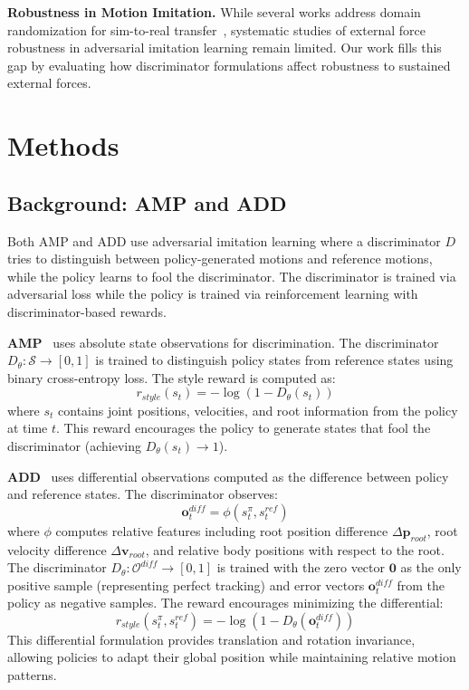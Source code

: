 \documentclass{article}
\begin{document}
\textbf{Robustness in Motion Imitation.} While several works address domain randomization for sim-to-real transfer~\citep{peng2018sim}, systematic studies of external force robustness in adversarial imitation learning remain limited. Our work fills this gap by evaluating how discriminator formulations affect robustness to sustained external forces.

\section{Methods}

\subsection{Background: AMP and ADD}

Both AMP and ADD use adversarial imitation learning where a discriminator $D$ tries to distinguish between policy-generated motions and reference motions, while the policy learns to fool the discriminator. The discriminator is trained via adversarial loss while the policy is trained via reinforcement learning with discriminator-based rewards.

\textbf{AMP}~\citep{peng2021amp} uses absolute state observations for discrimination. The discriminator $D_\theta: \mathcal{S} \rightarrow [0,1]$ is trained to distinguish policy states from reference states using binary cross-entropy loss. The style reward is computed as:
\begin{equation}
r_{style}(s_t) = -\log(1 - D_\theta(s_t))
\label{eq:amp_reward}
\end{equation}
where $s_t$ contains joint positions, velocities, and root information from the policy at time $t$. This reward encourages the policy to generate states that fool the discriminator (achieving $D_\theta(s_t) \rightarrow 1$).

\textbf{ADD}~\citep{zhang2025add} uses differential observations computed as the difference between policy and reference states. The discriminator observes:
\begin{equation}
\mathbf{o}^{diff}_t = \phi(s^{\pi}_t, s^{ref}_t)
\label{eq:add_obs}
\end{equation}
where $\phi$ computes relative features including root position difference $\Delta \mathbf{p}_{root}$, root velocity difference $\Delta \mathbf{v}_{root}$, and relative body positions with respect to the root. The discriminator $D_\theta: \mathcal{O}^{diff} \rightarrow [0,1]$ is trained with the zero vector $\mathbf{0}$ as the only positive sample (representing perfect tracking) and error vectors $\mathbf{o}^{diff}_t$ from the policy as negative samples. The reward encourages minimizing the differential:
\begin{equation}
r_{style}(s^{\pi}_t, s^{ref}_t) = -\log(1 - D_\theta(\mathbf{o}^{diff}_t))
\label{eq:add_reward}
\end{equation}
This differential formulation provides translation and rotation invariance, allowing policies to adapt their global position while maintaining relative motion patterns.
\end{document}
